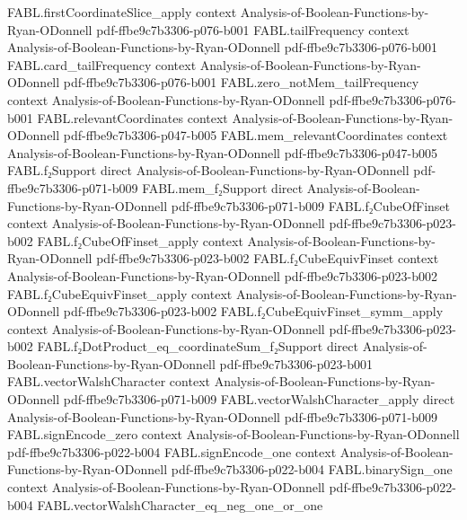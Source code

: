 \begin{theorem}
\proofstep
  {FABL.firstCoordinateSlice_apply}
  {context}
  {Analysis-of-Boolean-Functions-by-Ryan-ODonnell}
  {pdf-ffbe9c7b3306-p076-b001}
\proofstep
  {FABL.tailFrequency}
  {context}
  {Analysis-of-Boolean-Functions-by-Ryan-ODonnell}
  {pdf-ffbe9c7b3306-p076-b001}
\proofstep
  {FABL.card_tailFrequency}
  {context}
  {Analysis-of-Boolean-Functions-by-Ryan-ODonnell}
  {pdf-ffbe9c7b3306-p076-b001}
\proofstep
  {FABL.zero_notMem_tailFrequency}
  {context}
  {Analysis-of-Boolean-Functions-by-Ryan-ODonnell}
  {pdf-ffbe9c7b3306-p076-b001}
\proofstep
  {FABL.relevantCoordinates}
  {context}
  {Analysis-of-Boolean-Functions-by-Ryan-ODonnell}
  {pdf-ffbe9c7b3306-p047-b005}
\proofstep
  {FABL.mem_relevantCoordinates}
  {context}
  {Analysis-of-Boolean-Functions-by-Ryan-ODonnell}
  {pdf-ffbe9c7b3306-p047-b005}
\proofstep
  {FABL.f₂Support}
  {direct}
  {Analysis-of-Boolean-Functions-by-Ryan-ODonnell}
  {pdf-ffbe9c7b3306-p071-b009}
\proofstep
  {FABL.mem_f₂Support}
  {direct}
  {Analysis-of-Boolean-Functions-by-Ryan-ODonnell}
  {pdf-ffbe9c7b3306-p071-b009}
\proofstep
  {FABL.f₂CubeOfFinset}
  {context}
  {Analysis-of-Boolean-Functions-by-Ryan-ODonnell}
  {pdf-ffbe9c7b3306-p023-b002}
\proofstep
  {FABL.f₂CubeOfFinset_apply}
  {context}
  {Analysis-of-Boolean-Functions-by-Ryan-ODonnell}
  {pdf-ffbe9c7b3306-p023-b002}
\proofstep
  {FABL.f₂CubeEquivFinset}
  {context}
  {Analysis-of-Boolean-Functions-by-Ryan-ODonnell}
  {pdf-ffbe9c7b3306-p023-b002}
\proofstep
  {FABL.f₂CubeEquivFinset_apply}
  {context}
  {Analysis-of-Boolean-Functions-by-Ryan-ODonnell}
  {pdf-ffbe9c7b3306-p023-b002}
\proofstep
  {FABL.f₂CubeEquivFinset_symm_apply}
  {context}
  {Analysis-of-Boolean-Functions-by-Ryan-ODonnell}
  {pdf-ffbe9c7b3306-p023-b002}
\proofstep
  {FABL.f₂DotProduct_eq_coordinateSum_f₂Support}
  {direct}
  {Analysis-of-Boolean-Functions-by-Ryan-ODonnell}
  {pdf-ffbe9c7b3306-p023-b001}
\proofstep
  {FABL.vectorWalshCharacter}
  {context}
  {Analysis-of-Boolean-Functions-by-Ryan-ODonnell}
  {pdf-ffbe9c7b3306-p071-b009}
\proofstep
  {FABL.vectorWalshCharacter_apply}
  {direct}
  {Analysis-of-Boolean-Functions-by-Ryan-ODonnell}
  {pdf-ffbe9c7b3306-p071-b009}
\proofstep
  {FABL.signEncode_zero}
  {context}
  {Analysis-of-Boolean-Functions-by-Ryan-ODonnell}
  {pdf-ffbe9c7b3306-p022-b004}
\proofstep
  {FABL.signEncode_one}
  {context}
  {Analysis-of-Boolean-Functions-by-Ryan-ODonnell}
  {pdf-ffbe9c7b3306-p022-b004}
\proofstep
  {FABL.binarySign_one}
  {context}
  {Analysis-of-Boolean-Functions-by-Ryan-ODonnell}
  {pdf-ffbe9c7b3306-p022-b004}
\proofstep
  {FABL.vectorWalshCharacter_eq_neg_one_or_one}

\end{theorem}
